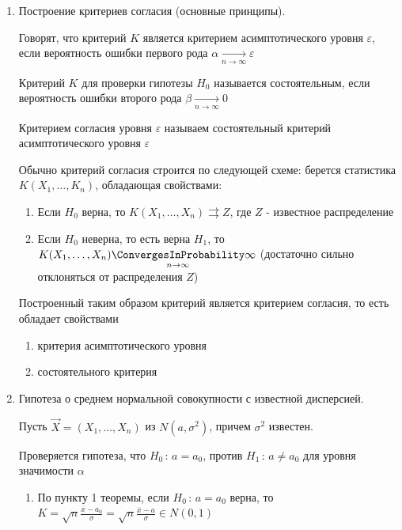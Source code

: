 \documentclass[12pt]{article}
\begin{document}
\begin{enumerate}
    \item Построение критериев согласия (основные принципы).

    \Defs Говорят, что критерий $K$ является критерием асимптотического уровня $\varepsilon$, если 
    вероятность ошибки первого рода $\alpha \underset{n \to \infty}{\longrightarrow} \varepsilon$

    \Defs Критерий $K$ для проверки гипотезы $H_0$ называется состоятельным, если вероятность ошибки второго рода
    $\beta \underset{n \to \infty}{\longrightarrow} 0$

    \Defs Критерием согласия уровня $\varepsilon$ называем состоятельный критерий асимптотического уровня
    $\varepsilon$

    Обычно критерий согласия строится по следующей схеме: берется статистика $K(X_1, \dots, K_n)$, 
    обладающая свойствами:

    \begin{enumerate}
        \item Если $H_0$ верна, то $K(X_1, \dots, X_n) \rightrightarrows Z$, где $Z$ - известное распределение

        \item Если $H_0$ неверна, то есть верна $H_1$, то $K(X_1, \dots, X_n) \underset{n \to \infty}{\ConvergesInProbability} \infty$ 
        (достаточно сильно отклоняться от распределения $Z$)
    \end{enumerate}

    \begin{MyTheorem}
        Построенный таким образом критерий является критерием согласия, то есть обладает свойствами

        \begin{enumerate}
            \item критерия асимптотического уровня
            \item состоятельного критерия
        \end{enumerate}
    \end{MyTheorem}


    \item Гипотеза о среднем нормальной совокупности с известной дисперсией.

    Пусть $\vec X = (X_1, \dots, X_n)$ из $N(a, \sigma^2)$, причем $\sigma^2$ известен.

    Проверяется гипотеза, что $H_0 \, : \, a = a_0$, против $H_1 \, : \, a \neq a_0$ для уровня значимости $\alpha$

    \begin{enumerate}
        \item По пункту 1 теоремы, если $H_0 \, : \, a = a_0$ верна, то $K = \sqrt{n} \frac{\overline{x} - a_0}{\sigma} = 
        \sqrt{n} \frac{\overline{x} - a}{\sigma} \in N(0, 1)$
        

\end{enumerate}
\end{enumerate}
\end{document}
